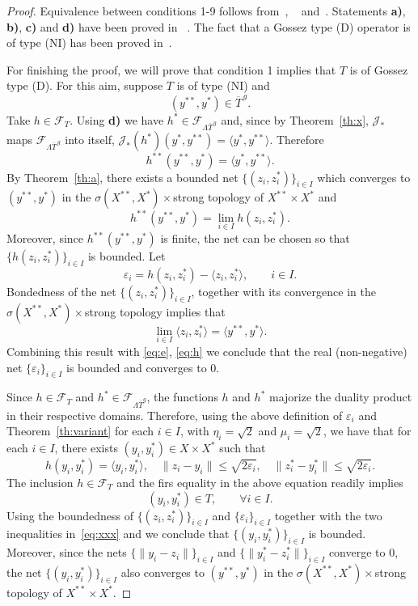 \documentclass[11pt]{article}
\newcommand{\F}{\mathcal{F}}
\newcommand{\J}{\mathcal{J}}
\newcommand{\inner}[2]{\langle{#1},{#2}\rangle}
\newcommand{\norm}[1]{\|#1\|}
\begin{document}
\begin{proof}
  Equivalence between conditions 1-9 follows from~\cite[Proposition 1.3]{alv.sva-max.jca09},
~\cite[Theorem 1.2]{alv.sva-new.jca09}
  and~\cite[Theorem 3.6]{Alves2008n}.
%
Statements {\bf a)}, {\bf b)}, {\bf c)} and {\bf d)} have been proved in 
~\cite[Theorem 1.1]{alv.sva-max.jca09}.
%
The fact that a Gossez type (D) operator is of type (NI) has been proved
in~\cite[Lemma 15]{sim-ran.jmaa96}.

For finishing the proof, we will
prove that condition 1 implies that $T$ is of Gossez type (D).
%
For this aim, suppose $T$ is of type (NI) and 
\[
 (y^{**},y^*)\in\overline T^{\,g}.
\]
Take $h\in \F_T$. Using {\bf d)} we have $h^*\in \F_{\Lambda \overline
  T^{\,g}}$ and, since by Theorem~\ref{th:x}, $\J_*$ maps $\F_{\Lambda
  \overline T^{\,g}}$ into itself,
%
$\J_*(h^*)(y^*,y^{**})=\inner{y^*}{y^{**}}$. Therefore %
\begin{equation}\label{eq:e}
 h^{**}(y^{**},y^*)=\inner{y^*}{y^{**}}.
\end{equation}
By Theorem~\ref{th:a}, there exists a bounded net
$\{(z_i,z^*_i)\}_{i\in I}$ which converges to $(y^{**},y^*)$ 
in the $\sigma(X^{**},X^*)\times$strong  topology 
of $X^{**}\times X^*$ and
%
\begin{equation}\label{eq:h}
 h^{**}(y^{**},y^*)=\lim_{i\in I} h(z_i,z_i^*).
\end{equation}
%
Moreover, since $h^{**}(y^{**},y^*)$ is finite, the net can be chosen
so that $\{ h(z_i,z_i^*)\}_{i\in I}$ is bounded.
%
Let
\[ \varepsilon_i= h(z_i,z_i^*)-\inner{z_i}{z_i^*},\qquad i\in I.
\]
Bondedness of the net $\{(z_i,z^*_i)\}_{i\in I}$, together with its
convergence in the $\sigma(X^{**},X^*)\times$strong topology implies
that 
\[
\lim_{i\in I}\inner{z_i}{z_i^*}=\inner{y^{**}}{y^*}.
\]
Combining
this result with \eqref{eq:e}, \eqref{eq:h} 
we conclude that the real (non-negative) net $\{\varepsilon_i\}_{i\in
  I}$ is bounded and converges to $0$.

Since $h\in \F_T$ and $h^*\in\F_{\Lambda\overline T^g}$, the functions
$h$ and $h^*$ majorize the duality product in their respective
domains. Therefore, using the above definition of $\varepsilon_i$ and 
Theorem~\ref{th:variant} 
 for each $i\in I$, with $\eta_i=\sqrt{2}$
and $\mu_i=\sqrt{2}$,
we have that for each $i\in I$, there exists 
$(y_i,y_i^*)\in X\times X^*$ such that
\begin{equation}
  \label{eq:xxx}
  h(y_i,y_i^*)=\inner{y_i}{y_i^*},\quad\|z_i-y_i\|\leq \sqrt{ 2
  \varepsilon_i},\quad\|z_i^*-y_i^*\|\leq \sqrt{2 \varepsilon_i}.
\end{equation}
%
The inclusion $h\in \F_T$ and the firs equality in the above equation
readily implies
\[ (y_i,y_i^*)\in T,\qquad \forall i\in I.
\]
Using the boundedness of $\{(z_i,z^*_i)\}_{i\in I}$ and
$\{\varepsilon_i\}_{i\in I}$ together with the two inequalities
in~\eqref{eq:xxx} and we conclude that $\{(y_i, y^*_i)\}_{i\in I}$ is
bounded.
%
Moreover, since the nets $\{\norm{y_i-z_i}\}_{i\in I}$ and
$\{\norm{y^*_i-z^*_i}\}_{i\in I}$ converge to $0$, the net $\{(y_i,
y^*_i)\}_{i\in I}$ also converges to $(y^{**},y^*)$ in the
$\sigma(X^{**},X^*)\times$strong topology of $X^{**}\times X^*$.
\end{proof}
\end{document}
